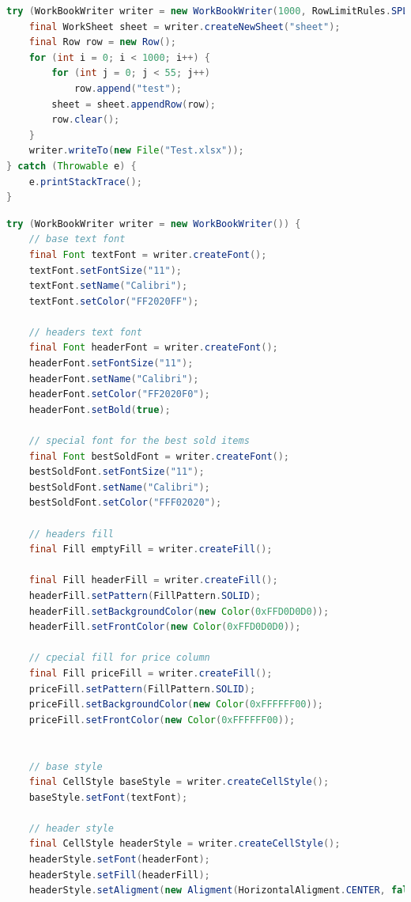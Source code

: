 \documentclass[14pt]{matmex-diploma}
\begin{document}
\begin{lstlisting}[language=Java, style=basic, caption={Пример создания простого документа XLSX с помощью библиотеки oxml-doc}, captionpos=b, label=java1]
try (WorkBookWriter writer = new WorkBookWriter(1000, RowLimitRules.SPLIT)) {
    final WorkSheet sheet = writer.createNewSheet("sheet");
    final Row row = new Row();
    for (int i = 0; i < 1000; i++) {
        for (int j = 0; j < 55; j++)
            row.append("test");
        sheet = sheet.appendRow(row);
        row.clear();
    }
    writer.writeTo(new File("Test.xlsx"));
} catch (Throwable e) {
    e.printStackTrace();
}
\end{lstlisting}

\begin{lstlisting}[language=Java, style=basic, caption={Пример создания документа XLSX с форматированием с помощью библиотеки oxml-doc}, captionpos=b, label=java2]
try (WorkBookWriter writer = new WorkBookWriter()) {
    // base text font
    final Font textFont = writer.createFont();
    textFont.setFontSize("11");
    textFont.setName("Calibri");
    textFont.setColor("FF2020FF");

    // headers text font
    final Font headerFont = writer.createFont();
    headerFont.setFontSize("11");
    headerFont.setName("Calibri");
    headerFont.setColor("FF2020F0");
    headerFont.setBold(true);

    // special font for the best sold items
    final Font bestSoldFont = writer.createFont();
    bestSoldFont.setFontSize("11");
    bestSoldFont.setName("Calibri");
    bestSoldFont.setColor("FFF02020");

    // headers fill
    final Fill emptyFill = writer.createFill();

    final Fill headerFill = writer.createFill();
    headerFill.setPattern(FillPattern.SOLID);
    headerFill.setBackgroundColor(new Color(0xFFD0D0D0));
    headerFill.setFrontColor(new Color(0xFFD0D0D0));

    // cpecial fill for price column
    final Fill priceFill = writer.createFill();
    priceFill.setPattern(FillPattern.SOLID);
    priceFill.setBackgroundColor(new Color(0xFFFFFF00));
    priceFill.setFrontColor(new Color(0xFFFFFF00));


    // base style
    final CellStyle baseStyle = writer.createCellStyle();
    baseStyle.setFont(textFont);

    // header style
    final CellStyle headerStyle = writer.createCellStyle();
    headerStyle.setFont(headerFont);
    headerStyle.setFill(headerFill);
    headerStyle.setAligment(new Aligment(HorizontalAligment.CENTER, false, VerticalAligment.CENTER));


\end{lstlisting}
\end{document}
